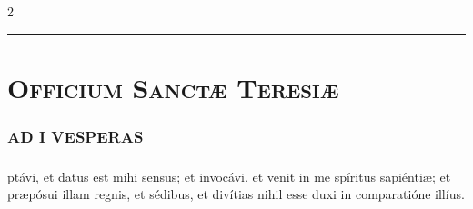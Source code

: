 \documentclass[9pt,twoside]{extarticle}
\begin{document}
\begin{multicols}{2}
\begin{center}\textcolor{red}{\rule{\linewidth}{0.5pt}} \end{center}

\section*{\center \textsc{Officium Sanctæ Teresiæ}}
\subsubsection*{\center {}}
\begin{center}\end{center}


\subsubsection*{\center \textsc{AD I VESPERAS}}
\subsubsection*{}
ptávi, et datus est mihi sensus; et invocávi, et venit in me spíritus sapiéntiæ; et præpósui illam regnis, et sédibus, et divítias nihil esse duxi in comparatióne illíus.


\end{multicols}
\end{document}
